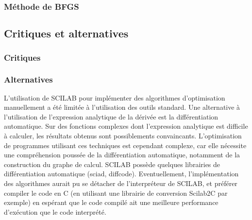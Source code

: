 \documentclass[3p, twocolumn]{elsarticle}
\begin{document}
\subsubsection{Méthode de BFGS}
\subsection{Critiques et alternatives}
\subsubsection{Critiques}
\subsubsection{Alternatives}

L'utilisation de SCILAB pour implémenter des algorithmes d'optimisation manuellement a été limitée à l'utilisation des outils standard. Une alternative à l'utilisation de l'expression analytique de la dérivée est la différentiation automatique. Sur des fonctions complexes dont l'expression analytique est difficile à calculer, les résultats obtenus sont possiblements convaincants. L'optimisation de programmes utilisant ces techniques est cependant complexe, car elle nécessite une compréhension poussée de la différentiation automatique, notamment de la construction du graphe de calcul. SCILAB possède quelques librairies de différentiation automatique (sciad, diffcode). Eventuellement, l'implémentation des algorithmes aurait pu se détacher de l'interpréteur de SCILAB, et préférer compiler le code en C (en utilisant une librairie de conversion Scilab2C par exemple) en espérant que le code compilé ait une meilleure performance d'exécution que le code interprété. 
\end{document}
